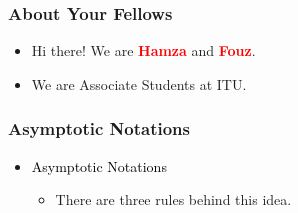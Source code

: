 
\begin{frame}
    \frametitle{About Your Fellows}
    \begin{itemize}
        \item Hi there! We are \textcolor{red}{\textbf{Hamza}} {and }\textcolor{red}{\textbf{Fouz}}.
        \item We are Associate Students at ITU.
    \end{itemize}
\end{frame}




\begin{frame}
    \frametitle{Asymptotic Notations}
    \begin{itemize}
        \item\textcolor{black}{Asymptotic Notations}
        \vspace{0.3cm}
        \begin{itemize}
            \item There are three rules behind this idea.
        \end{itemize}
    \end{itemize}
\end{frame}


